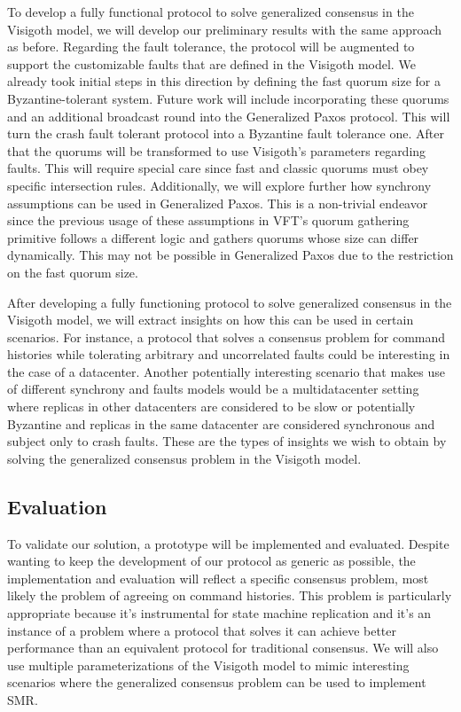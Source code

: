 \documentclass[runningheads,a4paper]{llncs}
\begin{document}
To develop a fully functional protocol to solve generalized consensus in the Visigoth model, we will develop our preliminary results with the same approach as before. Regarding the fault tolerance, the protocol will be augmented to support the customizable faults that are defined in the Visigoth model. We already took initial steps in this direction by defining the fast quorum size for a Byzantine-tolerant system. Future work will include incorporating these quorums and an additional broadcast round into the Generalized Paxos protocol. This will turn the crash fault tolerant protocol into a Byzantine fault tolerance one. After that the quorums will be transformed to use Visigoth's parameters regarding faults. This will require special care since fast and classic quorums must obey specific intersection rules. Additionally, we will explore further how synchrony assumptions can be used in Generalized Paxos. This is a non-trivial endeavor since the previous usage of these assumptions in VFT's quorum gathering primitive follows a different logic and gathers quorums whose size can differ dynamically. This may not be possible in Generalized Paxos due to the restriction on the fast quorum size.\par
After developing a fully functioning protocol to solve generalized consensus in the Visigoth model, we will extract insights on how this can be used in certain scenarios. For instance, a protocol that solves a consensus problem for command histories while tolerating arbitrary and uncorrelated faults could be interesting in the case of a datacenter. Another potentially interesting scenario that makes use of different synchrony and faults models would be a multidatacenter setting where replicas in other datacenters are considered to be slow or potentially Byzantine and replicas in the same datacenter are considered synchronous and subject only to crash faults. These are the types of insights we wish to obtain by solving the generalized consensus problem in the Visigoth model.

\subsection{Evaluation}  \label{Evaluation}
To validate our solution, a prototype will be implemented and evaluated. Despite wanting to keep the development of our protocol as generic as possible, the implementation and evaluation will reflect a specific consensus problem, most likely the problem of agreeing on command histories. This problem is particularly appropriate because it's instrumental for state machine replication and it's an instance of a problem where a protocol that solves it can achieve better performance than an equivalent protocol for traditional consensus. We will also use multiple parameterizations of the Visigoth model to mimic interesting scenarios where the generalized consensus problem can be used to implement SMR.
\end{document}
